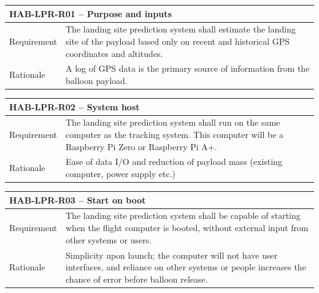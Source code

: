 \documentclass[11pt]{article}
\begin{document}


\begin{table}[!htbp] \centering
 \begin{tabular}{|p{2cm} p{11cm}|}
 \hline
  \multicolumn{2}{|l|}{HAB-LPR-R01 – Purpose and inputs} \\
  \hline
  Requirement & The landing site prediction system shall estimate the landing site of the payload based only on recent and historical GPS coordinates and altitudes. \\
  \hline
  Rationale & A log of GPS data is the primary source of information from the balloon payload.  \\
  \hline
 \end{tabular}
\end{table}

\begin{table}[!h] \centering
 \begin{tabular}{|p{2cm} p{11cm}|}
 \hline
  \multicolumn{2}{|l|}{HAB-LPR-R02 – System host} \\
  \hline
  Requirement & The landing site prediction system shall run on the same computer as the tracking system.  This computer will be a Raspberry Pi Zero or Raspberry Pi A+.  \\
  \hline
  Rationale & Ease of data I/O and reduction of payload mass (existing computer, power supply etc.)  \\
  \hline
 \end{tabular}
\end{table}

\begin{table}[!h] \centering
 \begin{tabular}{|p{2cm} p{11cm}|}
 \hline
  \multicolumn{2}{|l|}{HAB-LPR-R03 – Start on boot} \\
  \hline
  Requirement & The landing site prediction system shall be capable of starting when the flight computer is booted, without external input from other systems or users.  \\
  \hline
  Rationale & Simplicity upon launch; the computer will not have user interfaces, and reliance on other systems or people increases the chance of error before balloon release.  \\
  \hline
 \end{tabular}
\end{table}
\end{document}
